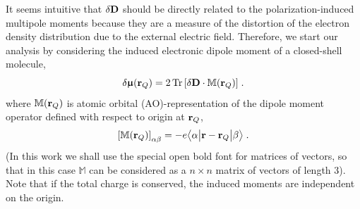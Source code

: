 \documentclass[aip,amsmath,amssymb,reprint,floatfix]{revtex4-1}
\newcommand{\tbraket}[3]{\ensuremath{\bigl\langle {#1} \bigl\lvert {#2} \bigl\lvert {#3} \bigr\rangle}}
\newcommand{\BM}[1]{\bm{#1}}
\DeclareMathOperator{\Tr}{Tr}
\begin{document}
It seems intuitive that $\delta {\bf D}$ should 
be directly related to the
polarization\hyp{}induced multipole moments because they are
a measure of the distortion of the electron density distribution due to the external electric
field. 
Therefore, 
we start our analysis by considering the induced electronic dipole moment 
of a closed-shell molecule, 
%
\begin{equation} \label{e:dmu-exact}
 \delta {\BM{\upmu}}({\bf r}_Q) = 
     2 \Tr{ 
         \left[ 
              \delta {\bf D} \cdot {\mathbb{M}({\bf r}_Q)}
         \right] } \;.
\end{equation}
%
where ${\mathbb{M}({\bf r}_Q)}$ is atomic orbital (AO)\hyp{}representation
of the dipole moment operator defined with respect to origin at ${\bf r}_Q$,
%
\begin{equation}\label{e:m}
 \left[ {\mathbb{M}({\bf r}_Q)} \right]_{\alpha\beta} = -e\tbraket{\alpha}{{\bf r} - {\bf r}_Q}{\beta} \;.
\end{equation}
%
(In this work we shall use the special open bold font for matrices of vectors, so that
in this case ${\mathbb{M}}$ can be considered as a $n \times n$ matrix of vectors of length 3).
Note that if the total charge is conserved, the induced moments are independent on the origin.
\end{document}

